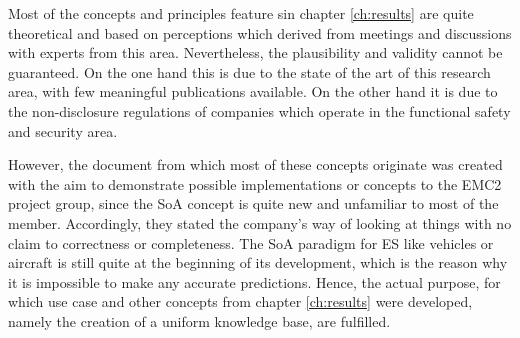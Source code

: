 Most of the concepts and principles feature sin chapter \ref{ch:results} are quite theoretical and based on perceptions which derived from meetings and discussions with experts from this area. Nevertheless, the plausibility and validity cannot be guaranteed. On the one hand this is due to the state of the art of this research area, with few meaningful publications available. On the other hand it is due to the non-disclosure regulations of companies which operate in the functional safety and security area.

However, the document from which most of these concepts originate was created with the aim to demonstrate possible implementations or concepts to the EMC2 project group, since the SoA concept is quite new and unfamiliar to most of the member. Accordingly, they stated the company's way of looking at things with no claim to correctness or completeness. The SoA paradigm for ES like vehicles or aircraft is still quite at the beginning of its development, which is the reason why it is impossible to make any accurate predictions. Hence, the actual purpose, for which use case and other concepts from chapter \ref{ch:results} were developed, namely the creation of a uniform knowledge base, are fulfilled.